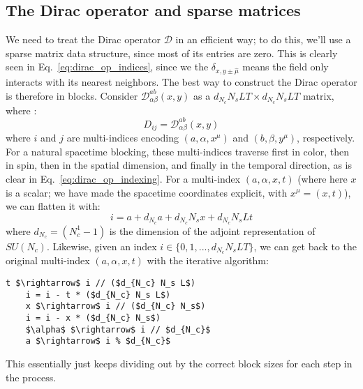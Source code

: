 \subsection{The Dirac operator and sparse matrices}

We need to treat the Dirac operator $\mathcal D$ in an efficient way; to do this, we'll use a sparse matrix data structure, since most of its entries are zero. This is clearly seen in Eq.~\eqref{eq:dirac_op_indices}, since we the $\delta_{x, y \pm \hat\mu}$ means the field only interacts with its nearest neighbors. The best way to construct the Dirac operator is therefore in blocks. Consider $\mathcal D_{\alpha\beta}^{ab}(x, y)$ as a $d_{N_c} N_s L T \times d_{N_c} N_s L T$ matrix, where :
\begin{equation}
	D_{ij} = \mathcal D_{\alpha\beta}^{ab}(x, y)
\end{equation}
where $i$ and $j$ are multi-indices encoding $(a, \alpha, x^\mu)$ and $(b, \beta, y^\mu)$, respectively. For a natural spacetime blocking, these multi-indices traverse first in color, then in spin, then in the spatial dimension, and finally in the temporal direction, as is clear in Eq.~\eqref{eq:dirac_op_indexing}. For a multi-index $(a, \alpha, x, t)$ (where here $x$ is a scalar; we have made the spacetime coordinates explicit, with $x^\mu = (x, t)$), we can flatten it with:
\begin{equation}
	i = a + d_{N_c} a + d_{N_c} N_s x + d_{N_c} N_s L t
\end{equation}
where $d_{N_c} = (N_c^1 - 1)$ is the dimension of the adjoint representation of $SU(N_c)$. Likewise, given an index $i\in \{0, 1, ..., d_{N_c} N_s L T\}$, we can get back to the original multi-index $(a, \alpha, x, t)$ with the iterative algorithm:
\begin{lstlisting}[mathescape]
	t $\rightarrow$ i // ($d_{N_c} N_s L$)
	i = i - t * ($d_{N_c} N_s L$)
	x $\rightarrow$ i // ($d_{N_c} N_s$)
	i = i - x * ($d_{N_c} N_s$)
	$\alpha$ $\rightarrow$ i // $d_{N_c}$
	a $\rightarrow$ i % $d_{N_c}$
\end{lstlisting}
This essentially just keeps dividing out by the correct block sizes for each step in the process. 

